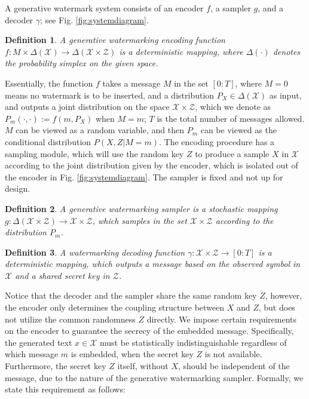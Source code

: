 \documentclass[11pt,letterpaper]{article}
\newtheorem{definition}{\textbf{Definition}}%
\newcommand{\cX}{\mathcal{X}}
\newcommand{\cZ}{\mathcal{Z}}
\begin{document}
A generative watermark system consists of an encoder $f$, a sampler $g$, and a decoder $\gamma$; see Fig. \ref{fig:systemdiagram}. 

\begin{definition}
A generative watermarking encoding function $f: M \times \Delta(\cX) \rightarrow \Delta(\cX\times\cZ)$ is a deterministic mapping, where $\Delta(\cdot)$ denotes the probability simplex on the given space. 
\end{definition}
Essentially, the function $f$ takes a message $M$ in the set $[0:T]$, where $M=0$ means no watermark is to be inserted, and a distribution $P_X \in \Delta(\cX)$ as input, and outputs a joint distribution on the space $\cX\times\cZ$, which we denote as $P_m(\cdot,\cdot) := f(m, P_X)$ when $M=m$; $T$ is the total number of messages allowed. $M$ can be viewed as a random variable, and then $P_m$ can be viewed as the conditional distribution $P(X,Z|M=m)$. The encoding procedure has a sampling module, which will use the random key $Z$ to produce a sample $X$ in $\cX$ according to the joint distribution given by the encoder, which is isolated out of the encoder in Fig. \ref{fig:systemdiagram}. The sampler is fixed and not up for design. 

\begin{definition}
A generative watermarking sampler is a stochastic mapping $g:\Delta(\cX\times\cZ)\rightarrow \cX\times\cZ$, which samples in the set $\cX\times \cZ$ according to the distribution $P_m$.
\end{definition}

\begin{definition} \label{def:decoder}
A watermarking decoding function $\gamma: \cX \times \cZ \rightarrow [0:T]$ is a deterministic mapping, which outputs a message based on the observed symbol in $\cX$ and a shared secret key in $\cZ$.
\end{definition}


Notice that the decoder and the sampler share the same random key $Z$, however, the encoder only determines the coupling structure between $X$ and $Z$, but does not utilize the common randomness $Z$ directly. We impose certain requirements on the encoder to guarantee the secrecy of the embedded message. Specifically, the generated text $x \in \cX$ must be statistically indistinguishable regardless of which message $m$ is embedded, when the secret key $Z$ is not available. Furthermore, the secret key $Z$ itself, without $X$, should be independent of the message, due to the nature of the generative watermarking sampler. Formally, we state this requirement as follows:
\end{document}
